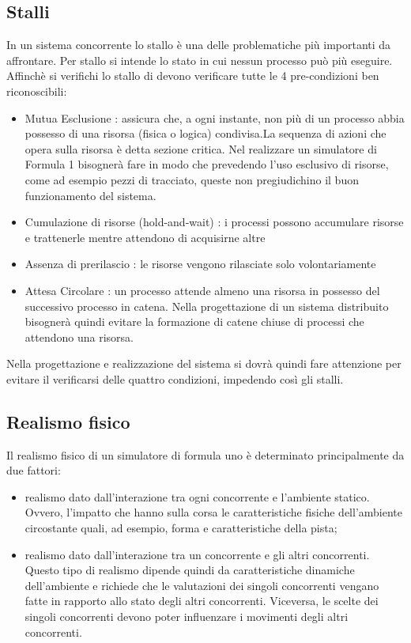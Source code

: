 \subsection{Stalli }
\label{stalli}
In un sistema concorrente lo stallo è una delle problematiche pi\`{u} importanti
da affrontare. Per stallo si intende lo stato in cui nessun processo pu\`{o}
pi\`{u} eseguire. Affinch\`{e} si verifichi lo stallo di devono verificare tutte
le 4 pre-condizioni ben riconoscibili:
\begin{itemize}
\item {Mutua Esclusione :} assicura che, a ogni instante, non pi\`{u} di un
processo abbia possesso di una risorsa (fisica o logica) condivisa.La sequenza
di azioni che opera sulla risorsa \`{e} detta sezione critica. Nel realizzare un
simulatore di Formula 1 bisogner\`{a} fare in modo che prevedendo l'uso
esclusivo di risorse, come ad esempio pezzi di tracciato, queste non
pregiudichino il buon funzionamento del sistema.
\item{Cumulazione di risorse (hold-and-wait) :} i processi possono accumulare
risorse e trattenerle mentre attendono di acquisirne altre
\item{Assenza di prerilascio :} le risorse vengono rilasciate solo
volontariamente
\item{Attesa Circolare :} un processo attende almeno una risorsa in possesso del
successivo processo in catena. Nella progettazione di un sistema distribuito
bisogner\`{a} quindi evitare la formazione di catene chiuse di processi che
attendono una risorsa.
\end{itemize}
Nella progettazione e realizzazione del sistema si dovr\`{a} quindi fare
attenzione per evitare il verificarsi delle quattro condizioni, impedendo
cos\`{i} gli stalli.
\subsection{Realismo fisico}
Il realismo fisico di un simulatore di formula uno è determinato principalmente
da due fattori:
\begin{itemize}
\item realismo dato dall'interazione tra ogni concorrente e l'ambiente statico.
Ovvero, l'impatto che hanno sulla corsa
le caratteristiche fisiche dell'ambiente circostante quali, ad esempio, forma e
caratteristiche della pista;
\item realismo dato dall'interazione tra un concorrente e gli altri concorrenti.
Questo tipo di realismo 
dipende quindi da caratteristiche dinamiche dell'ambiente e richiede che le
valutazioni dei singoli concorrenti
vengano fatte in rapporto allo stato degli altri concorrenti. Viceversa, le
scelte dei singoli concorrenti
devono poter influenzare i movimenti degli altri concorrenti.
\end{itemize}
